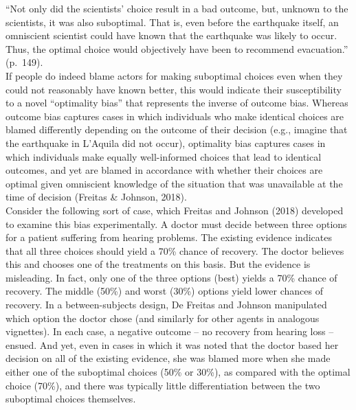 \documentclass[
  man, donotrepeattitle,floatsintext]{apa6}
\begin{document}
``Not only did the scientists' choice result in a bad outcome, but, unknown to the scientists, it was also suboptimal. That is, even before the earthquake itself, an omniscient scientist could have known that the earthquake was likely to occur. Thus, the optimal choice would objectively have been to recommend evacuation.'' (p.~149).\\
If people do indeed blame actors for making suboptimal choices even when they could not reasonably have known better, this would indicate their susceptibility to a novel ``optimality bias'' that represents the inverse of outcome bias. Whereas outcome bias captures cases in which individuals who make identical choices are blamed differently depending on the outcome of their decision (e.g., imagine that the earthquake in L'Aquila did not occur), optimality bias captures cases in which individuals make equally well-informed choices that lead to identical outcomes, and yet are blamed in accordance with whether their choices are optimal given omniscient knowledge of the situation that was unavailable at the time of decision (Freitas \& Johnson, 2018).\\
Consider the following sort of case, which Freitas and Johnson (2018) developed to examine this bias experimentally. A doctor must decide between three options for a patient suffering from hearing problems. The existing evidence indicates that all three choices should yield a 70\% chance of recovery. The doctor believes this and chooses one of the treatments on this basis. But the evidence is misleading. In fact, only one of the three options (best) yields a 70\% chance of recovery. The middle (50\%) and worst (30\%) options yield lower chances of recovery. In a between-subjects design, De Freitas and Johnson manipulated which option the doctor chose (and similarly for other agents in analogous vignettes). In each case, a negative outcome -- no recovery from hearing loss -- ensued. And yet, even in cases in which it was noted that the doctor based her decision on all of the existing evidence, she was blamed more when she made either one of the suboptimal choices (50\% or 30\%), as compared with the optimal choice (70\%), and there was typically little differentiation between the two suboptimal choices themselves.\\
\end{document}
